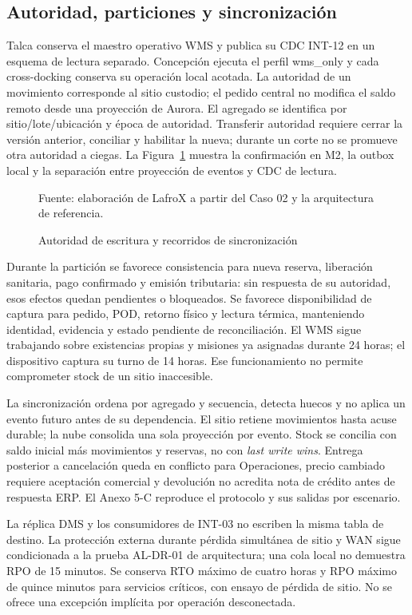 \subsection{Autoridad, particiones y sincronización}
Talca conserva el maestro operativo WMS y publica su CDC INT-12 en un esquema de lectura separado. Concepción ejecuta el perfil wms\_only y cada cross-docking conserva su operación local acotada. La autoridad de un movimiento corresponde al sitio custodio; el pedido central no modifica el saldo remoto desde una proyección de Aurora. El agregado se identifica por sitio/lote/ubicación y época de autoridad. Transferir autoridad requiere cerrar la versión anterior, conciliar y habilitar la nueva; durante un corte no se promueve otra autoridad a ciegas.
La Figura~\ref{fig:5-autoridad} muestra la confirmación en M2, la outbox local y la separación entre proyección de eventos y CDC de lectura.

\begin{figure}[htbp]
\centering

\caption{Autoridad de escritura y recorridos de sincronización}
\label{fig:5-autoridad}
{\fontsize{9pt}{11pt}\selectfont Fuente: elaboración de LafroX a partir del Caso 02 y la arquitectura de referencia.}
\end{figure}\FloatBarrier

Durante la partición se favorece consistencia para nueva reserva, liberación sanitaria, pago confirmado y emisión tributaria: sin respuesta de su autoridad, esos efectos quedan pendientes o bloqueados. Se favorece disponibilidad de captura para pedido, POD, retorno físico y lectura térmica, manteniendo identidad, evidencia y estado pendiente de reconciliación. El WMS sigue trabajando sobre existencias propias y misiones ya asignadas durante 24 horas; el dispositivo captura su turno de 14 horas. Ese funcionamiento no permite comprometer stock de un sitio inaccesible.

La sincronización ordena por agregado y secuencia, detecta huecos y no aplica un evento futuro antes de su dependencia. El sitio retiene movimientos hasta acuse durable; la nube consolida una sola proyección por evento. Stock se concilia con saldo inicial más movimientos y reservas, no con \emph{last write wins}. Entrega posterior a cancelación queda en conflicto para Operaciones, precio cambiado requiere aceptación comercial y devolución no acredita nota de crédito antes de respuesta ERP. El Anexo 5-C reproduce el protocolo y sus salidas por escenario.

La réplica DMS y los consumidores de INT-03 no escriben la misma tabla de destino. La protección externa durante pérdida simultánea de sitio y WAN sigue condicionada a la prueba AL-DR-01 de arquitectura; una cola local no demuestra RPO de 15 minutos. Se conserva RTO máximo de cuatro horas y RPO máximo de quince minutos para servicios críticos, con ensayo de pérdida de sitio. No se ofrece una excepción implícita por operación desconectada.

